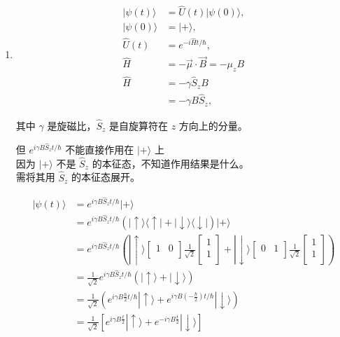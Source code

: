 \documentclass[lang=cn,10pt]{elegantbook}
\begin{document}
\begin{solution}
	\begin{enumerate}
		\item \begin{align*}
		|\psi(t)\rangle &= \hat{U}(t) |\psi(0)\rangle, \\
		|\psi(0)\rangle &= |+\rangle, \\
		\hat{U}(t) &= e^{-i \hat{H} t / \hbar}, \\
		\hat{H} &= -\vec{\mu} \cdot \vec{B} = -\mu_z B\\
		\hat{H} &= -\gamma \hat{S}_z B \\
		&= -\gamma B \hat{S}_z,
		\end{align*}
		
		其中 $\gamma$ 是旋磁比，$\hat{S}_z$ 是自旋算符在 $z$ 方向上的分量。
		
		但 $e^{i \gamma B \hat{S}_z t / \hbar}$ 不能直接作用在 $|+\rangle$ 上 \\
		因为 $|+\rangle$ 不是 $\hat{S}_z$ 的本征态，不知道作用结果是什么。 \\
		需将其用 $\hat{S}_z$ 的本征态展开。
		
		\begin{align*}
			|\psi(t)\rangle &= e^{i \gamma B \hat{S}_z t / \hbar} |+\rangle \\
			&= e^{i \gamma B \hat{S}_z t / \hbar} (| \uparrow \rangle \langle \uparrow | + | \downarrow \rangle \langle \downarrow |) |+\rangle \\
			&= e^{i\gamma B\hat{S}_zt/\hbar}\left( |\uparrow \rangle \left[ \begin{matrix}
				1&		0\\
			\end{matrix} \right] \frac{1}{\sqrt{2}}\left[ \begin{array}{c}
				1\\
				1\\
			\end{array} \right] +|\downarrow \rangle \left[ \begin{matrix}
				0&		1\\
			\end{matrix} \right] \frac{1}{\sqrt{2}}\left[ \begin{array}{c}
				1\\
				1\\
			\end{array} \right] \right)  \\
			&= \frac{1}{\sqrt{2}} e^{i \gamma B \hat{S}_z t / \hbar} (| \uparrow \rangle + | \downarrow \rangle) \\
			&= \frac{1}{\sqrt{2}} \left( e^{i \gamma B \frac{\hbar}{2} t / \hbar} | \uparrow \rangle + e^{i \gamma B \left(-\frac{\hbar}{2}\right) t / \hbar} | \downarrow \rangle \right) \\
			&= \frac{1}{\sqrt{2}} \left[ e^{i \gamma B \frac{t}{2}} | \uparrow \rangle + e^{-i \gamma B \frac{t}{2}} | \downarrow \rangle \right]
		\end{align*}
		

\end{enumerate}
\end{solution}
\end{document}
